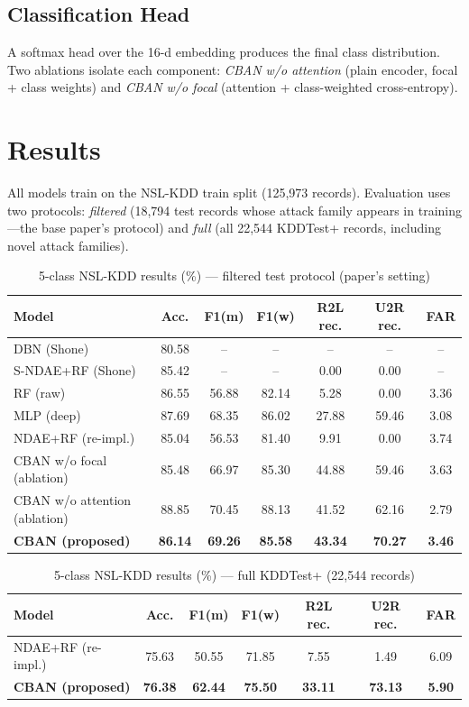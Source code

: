 \documentclass[conference]{IEEEtran}
\begin{document}
\subsection{Classification Head}
A softmax head over the 16-d embedding produces the final class distribution.
Two ablations isolate each component: \emph{CBAN w/o attention} (plain encoder,
focal + class weights) and \emph{CBAN w/o focal} (attention + class-weighted
cross-entropy).

\section{Results}
All models train on the NSL-KDD train split (125,973 records). Evaluation uses
two protocols: \emph{filtered} (18,794 test records whose attack family appears
in training---the base paper's protocol) and \emph{full} (all 22,544 KDDTest+
records, including novel attack families).

\begin{table}[!t]
\caption{5-class NSL-KDD results (\%) --- filtered test protocol (paper's setting)}
\label{tab:filtered}
\centering
\begin{tabular}{lcccccc}
\toprule
Model & Acc. & F1(m) & F1(w) & R2L rec. & U2R rec. & FAR\\
\midrule
DBN (Shone)~\cite{shone2018}       & 80.58 & -- & -- & -- & -- & --\\
S-NDAE+RF (Shone)~\cite{shone2018} & 85.42 & -- & -- & 0.00 & 0.00 & --\\
RF (raw)                           & 86.55 & 56.88 & 82.14 & 5.28 & 0.00 & 3.36\\
MLP (deep)                         & 87.69 & 68.35 & 86.02 & 27.88 & 59.46 & 3.08\\
NDAE+RF (re-impl.)                 & 85.04 & 56.53 & 81.40 & 9.91 & 0.00 & 3.74\\
CBAN w/o focal (ablation)          & 85.48 & 66.97 & 85.30 & 44.88 & 59.46 & 3.63\\
CBAN w/o attention (ablation)      & 88.85 & 70.45 & 88.13 & 41.52 & 62.16 & 2.79\\
\textbf{CBAN (proposed)}           & \textbf{86.14} & \textbf{69.26} & \textbf{85.58} & \textbf{43.34} & \textbf{70.27} & \textbf{3.46}\\
\bottomrule
\end{tabular}
\end{table}

\begin{table}[!t]
\caption{5-class NSL-KDD results (\%) --- full KDDTest+ (22,544 records)}
\label{tab:full}
\centering
\begin{tabular}{lcccccc}
\toprule
Model & Acc. & F1(m) & F1(w) & R2L rec. & U2R rec. & FAR\\
\midrule
NDAE+RF (re-impl.)                 & 75.63 & 50.55 & 71.85 & 7.55 & 1.49 & 6.09\\
\textbf{CBAN (proposed)}           & \textbf{76.38} & \textbf{62.44} & \textbf{75.50} & \textbf{33.11} & \textbf{73.13} & \textbf{5.90}\\
\bottomrule
\end{tabular}
\end{table}
\end{document}

